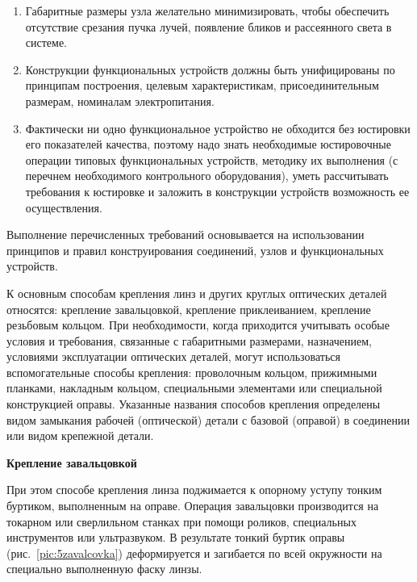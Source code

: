 \begin{enumerate}
\item Габаритные размеры узла желательно минимизировать, чтобы обеспечить отсутствие срезания пучка лучей, появление бликов и рассеянного света в системе.

\item Конструкции функциональных устройств должны быть унифицированы по принципам построения, целевым характеристикам, присоединительным размерам, номиналам электропитания.

\item Фактически ни одно функциональное устройство не обходится без юстировки его показателей качества, поэтому надо знать необходимые юстировочные операции типовых функциональных устройств, методику их выполнения (с перечнем необходимого контрольного оборудования), уметь рассчитывать требования к юстировке и заложить в конструкции устройств возможность ее осуществления.

\end{enumerate}

Выполнение перечисленных требований основывается на использовании принципов и правил конструирования соединений, узлов и функциональных устройств.


К основным способам крепления линз и других круглых оптических деталей относятся: крепление завальцовкой, крепление приклеиванием, крепление резьбовым кольцом. При необходимости, когда приходится учитывать особые условия и требования, связанные с габаритными размерами, назначением, условиями эксплуатации оптических деталей, могут использоваться вспомогательные способы крепления: проволочным кольцом, прижимными планками, накладным кольцом, специальными элементами или специальной конструкцией оправы. Указанные названия способов крепления определены видом замыкания рабочей (оптической) детали с базовой (оправой) в соединении или видом крепежной детали.

\begin{flushleft}
	\textbf{Крепление завальцовкой}
\end{flushleft}

При этом способе крепления линза поджимается к опорному уступу тонким буртиком, выполненным на оправе. Операция завальцовки производится на токарном или сверлильном станках при помощи роликов, специальных инструментов или ультразвуком. В результате тонкий буртик оправы (рис.~\ref{pic:5zavalcovka}) деформируется и загибается по всей окружности на специально выполненную фаску линзы.

